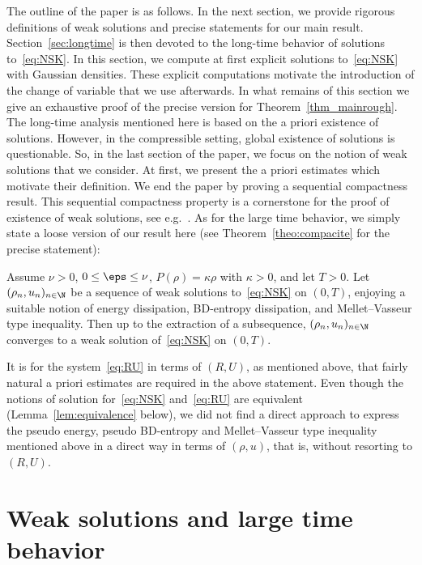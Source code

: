 The outline of the paper is as follows. In the next section, we provide rigorous definitions of weak solutions and precise statements for our main result. Section~\ref{sec:longtime} is then devoted to the long-time behavior of solutions to~\eqref{eq:NSK}. In this section, we compute at first explicit solutions to~\eqref{eq:NSK} with Gaussian densities. These explicit computations motivate the introduction of the change of variable that we use afterwards. In what remains of this section we give an exhaustive proof of the precise version for Theorem~\ref{thm_mainrough}. The long-time analysis mentioned here is based on the a priori existence of solutions. However, in the compressible setting, global existence of solutions is questionable. So, in the last section of the paper, we focus on the notion of weak solutions that we consider. At first, we present the a priori estimates which motivate their definition. We end the paper by proving a sequential compactness result. This sequential compactness property is a cornerstone for the proof of existence of weak solutions, see e.g.~\cite{Lio98,Fei04}. As for the large time behavior, we simply state a loose version of our result here (see Theorem~\ref{theo:compacite} for the precise statement):
\begin{theo}
Assume $\nu >0$, $0\le \eps \le \nu$, $P(\rho)=\kappa \rho$ with $\kappa>0$, and let $T>0$. Let $(\rho_n,u_n)_{n\in \N}$ be a sequence of weak solutions to~\eqref{eq:NSK} on $(0,T)$, enjoying a suitable notion of energy dissipation, BD-entropy dissipation, and Mellet--Vasseur type inequality. Then up to the extraction of a subsequence, $(\rho_n,u_n)_{n\in \N}$ converges to a weak solution of~\eqref{eq:NSK} on $(0,T)$.
\end{theo}

It is for the system~\eqref{eq:RU} in terms of $(R,U)$, as mentioned above, that fairly natural a priori estimates are required in the above statement. Even though the notions of solution for~\eqref{eq:NSK} and~\eqref{eq:RU} are equivalent (Lemma~\ref{lem:equivalence} below), we did not find a direct approach to express the pseudo energy, pseudo BD-entropy and Mellet--Vasseur type inequality mentioned above in a direct way in terms of $(\rho,u)$, that is, without resorting to $(R,U)$.



\section{Weak solutions and large time behavior}\label{sec:main}


